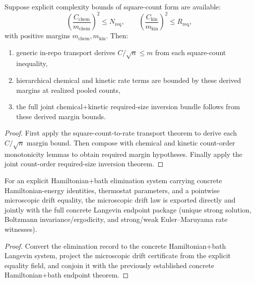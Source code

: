 \begin{theorem}\label{thm:finite-sample-square-count-inversion}
Suppose explicit complexity bounds of square-count form are available:
\[
\left(\frac{C_{\mathrm{chem}}}{m_{\mathrm{chem}}}\right)^2 \le N_{\mathrm{req}},
\qquad
\left(\frac{C_{\mathrm{kin}}}{m_{\mathrm{kin}}}\right)^2 \le R_{\mathrm{req}},
\]
with positive margins $m_{\mathrm{chem}},m_{\mathrm{kin}}$. Then:
\begin{enumerate}
\item generic in-repo transport derives $C/\sqrt{n}\le m$ from each square-count inequality,
\item hierarchical chemical and kinetic rate terms are bounded by these derived margins at realized pooled counts,
\item the full joint chemical+kinetic required-size inversion bundle follows from these derived margin bounds.
\end{enumerate}
\end{theorem}

\begin{proof}
First apply the square-count-to-rate transport theorem to derive each $C/\sqrt{n}$ margin bound. Then compose with chemical and kinetic count-order monotonicity lemmas to obtain required margin hypotheses. Finally apply the joint count-order required-size inversion theorem.
\end{proof}

\begin{theorem}\label{thm:explicit-hamiltonian-bath-elimination-langevin-endpoints}
For an explicit Hamiltonian+bath elimination system carrying concrete Hamiltonian-energy identities, thermostat parameters, and a pointwise microscopic drift equality, the microscopic drift law is exported directly and jointly with the full concrete Langevin endpoint package (unique strong solution, Boltzmann invariance/ergodicity, and strong/weak Euler--Maruyama rate witnesses).
\end{theorem}

\begin{proof}
Convert the elimination record to the concrete Hamiltonian+bath Langevin system, project the microscopic drift certificate from the explicit equality field, and conjoin it with the previously established concrete Hamiltonian+bath endpoint theorem.
\end{proof}

